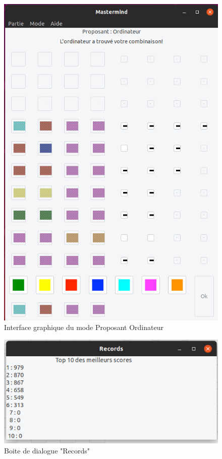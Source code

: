 \documentclass[a4paper, 11pt, oneside]{article}
\begin{document}
\begin{figure}[H] 
    \center
        \includegraphics[scale=0.3]{images_rapport/proposantordi.png}
        \caption{Interface graphique du mode Proposant Ordinateur}
\end{figure}
\begin{figure}[H] 
    \center
        \includegraphics[scale=0.5]{images_rapport/records.png}  
        \caption{Boite de dialogue "Records"}
\end{figure}
\end{document}
